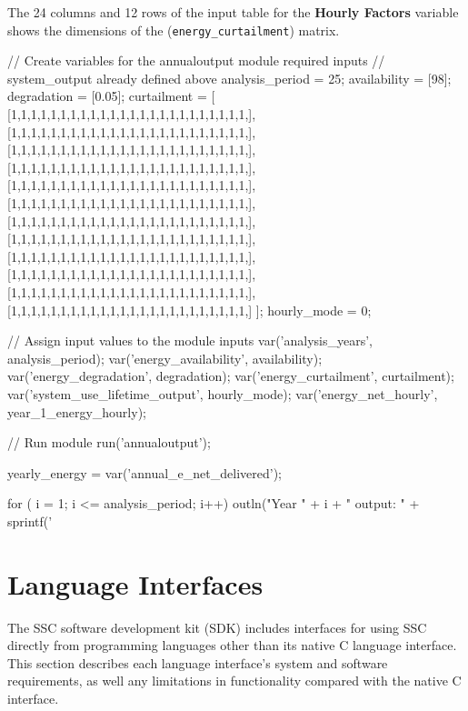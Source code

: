 \documentclass{article}
\begin{document}
The 24 columns and 12 rows of the input table for the \textbf{Hourly Factors} variable shows the dimensions of the (\texttt{energy\_curtailment}) matrix.

\begin{verbatimtab}

// Create variables for the annualoutput module required inputs
// system_output already defined above
analysis_period = 25;
availability = [98];
degradation = [0.05];
curtailment = [ [1,1,1,1,1,1,1,1,1,1,1,1,1,1,1,1,1,1,1,1,1,1,1,1,],
                [1,1,1,1,1,1,1,1,1,1,1,1,1,1,1,1,1,1,1,1,1,1,1,1,],
                [1,1,1,1,1,1,1,1,1,1,1,1,1,1,1,1,1,1,1,1,1,1,1,1,],
                [1,1,1,1,1,1,1,1,1,1,1,1,1,1,1,1,1,1,1,1,1,1,1,1,],
                [1,1,1,1,1,1,1,1,1,1,1,1,1,1,1,1,1,1,1,1,1,1,1,1,],
                [1,1,1,1,1,1,1,1,1,1,1,1,1,1,1,1,1,1,1,1,1,1,1,1,],
                [1,1,1,1,1,1,1,1,1,1,1,1,1,1,1,1,1,1,1,1,1,1,1,1,],
                [1,1,1,1,1,1,1,1,1,1,1,1,1,1,1,1,1,1,1,1,1,1,1,1,],
                [1,1,1,1,1,1,1,1,1,1,1,1,1,1,1,1,1,1,1,1,1,1,1,1,],
                [1,1,1,1,1,1,1,1,1,1,1,1,1,1,1,1,1,1,1,1,1,1,1,1,],
                [1,1,1,1,1,1,1,1,1,1,1,1,1,1,1,1,1,1,1,1,1,1,1,1,],
                [1,1,1,1,1,1,1,1,1,1,1,1,1,1,1,1,1,1,1,1,1,1,1,1,] ];
hourly_mode = 0;

// Assign input values to the module inputs
var('analysis_years', analysis_period);
var('energy_availability', availability);
var('energy_degradation', degradation);
var('energy_curtailment', curtailment);
var('system_use_lifetime_output', hourly_mode);
var('energy_net_hourly', year_1_energy_hourly);

// Run module
run('annualoutput');

yearly_energy = var('annual_e_net_delivered');

for ( i = 1; i <= analysis_period; i++)
{
  outln("Year " + i + " output: " + sprintf('%
}


\end{verbatimtab}

\section{Language Interfaces}

The SSC software development kit (SDK) includes interfaces for using SSC directly from programming languages other than its native C language interface.  This section describes each language interface's system and software requirements, as well any limitations in functionality compared with the native C interface.
\end{document}
